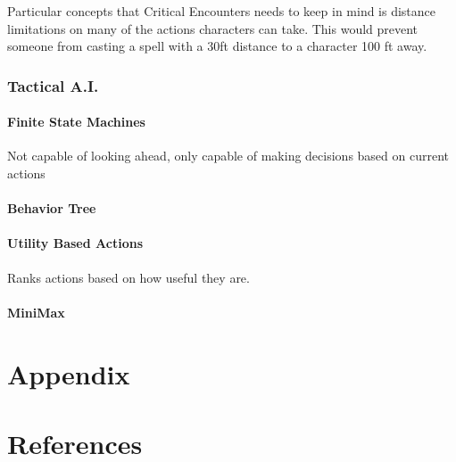 \documentclass[12pt,a4paper]{report}
\begin{document}
			Particular concepts that Critical Encounters needs to keep in mind is distance limitations on many of the actions characters can take. This would prevent someone from casting a spell with a 30ft distance to a character 100 ft away.
		
		\subsection{Tactical A.I.}
		\subsubsection{Finite State Machines}
		Not capable of looking ahead, only capable of making decisions based on current actions
		\subsubsection{Behavior Tree}
		\subsubsection{Utility Based Actions}
		Ranks actions based on how useful they are.
		\subsubsection{MiniMax}

\newpage
\chapter*{Appendix}

\newpage
{}
\listoffigures

\newpage
{}
\listoftables

\newpage
\chapter*{References}
\end{document}
